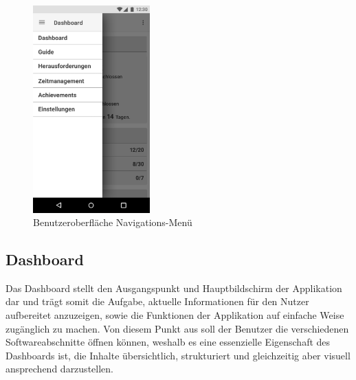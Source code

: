 \documentclass[bibliography=totoc,listof=totoc,BCOR=5mm,DIV=12,oneside]{scrbook}
\begin{document}
\begin{figure}[H]
	\centering
	\includegraphics[width=0.4\textwidth,keepaspectratio]{Bilder/Prototyp/Menu.png}
	\caption{Benutzeroberfläche Navigations-Menü}
	\label{img:navigation}
\end{figure}

\newpage
\subsection{Dashboard}
\par Das Dashboard stellt den Ausgangspunkt und Hauptbildschirm der Applikation dar und trägt somit die Aufgabe, aktuelle Informationen für den Nutzer aufbereitet anzuzeigen, sowie die Funktionen der Applikation auf einfache Weise zugänglich zu machen. Von diesem Punkt aus soll der Benutzer die verschiedenen Softwareabschnitte öffnen können, weshalb es eine essenzielle Eigenschaft des Dashboards ist, die Inhalte übersichtlich, strukturiert und gleichzeitig aber visuell ansprechend darzustellen.
\end{document}
